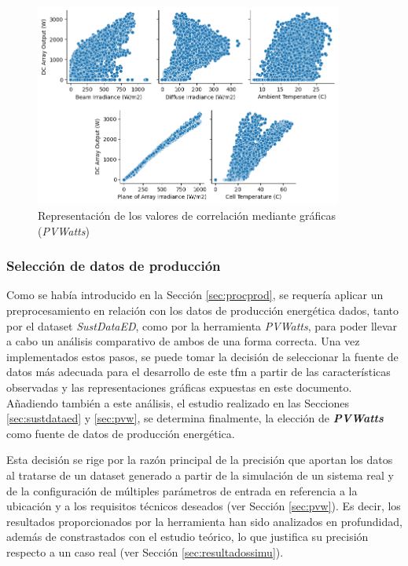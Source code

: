 \begin{figure}[H]
  \centering
  \includegraphics[width=0.9\textwidth]{img/diseno/corrgraficas.png}
  \caption{Representación de los valores de correlación mediante gráficas (\textit{PVWatts})}
  \label{fig:corrgraficas}
\end{figure}

\subsubsection{Selección de datos de producción}
\label{sec:select}

Como se había introducido en la Sección \ref{sec:procprod}, se requería aplicar un preprocesamiento en relación con los datos de producción energética dados, tanto por el dataset \textit{SustDataED}, como por la herramienta \textit{PVWatts}, para poder llevar a cabo un análisis comparativo de ambos de una forma correcta. Una vez implementados estos pasos, se puede tomar la decisión de seleccionar la fuente de datos más adecuada para el desarrollo de este \gls{tfm} a partir de las características observadas y las representaciones gráficas expuestas en este documento. Añadiendo también a este análisis, el estudio realizado en las Secciones \ref{sec:sustdataed} y \ref{sec:pvw}, se determina finalmente, la elección de \textbf{\textit{PVWatts}} como fuente de datos de producción energética. 

\vspace{3mm}

Esta decisión se rige por la razón principal de la precisión que aportan los datos al tratarse de un dataset generado a partir de la simulación de un sistema real y de la configuración de múltiples parámetros de entrada en referencia a la ubicación y a los requisitos técnicos deseados (ver Sección \ref{sec:pvw}). Es decir, los resultados proporcionados por la herramienta han sido analizados en profundidad, además de constrastados con el estudio teórico, lo que justifica su precisión respecto a un caso real (ver Sección \ref{sec:resultadossimu}).  

